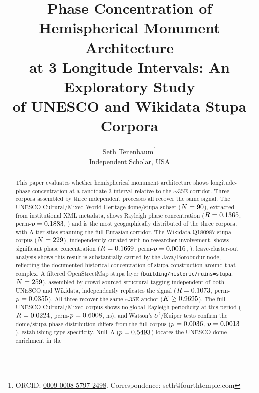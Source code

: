 \documentclass[12pt,a4paper]{article}
\begin{document}
\title{Phase Concentration of Hemispherical Monument Architecture\\
at 3\textdegree{} Longitude Intervals: An Exploratory Study\\
of UNESCO and Wikidata Stupa Corpora}

\author{Seth Tenenbaum\thanks{ORCID: \href{https://orcid.org/0009-0008-5797-2498}{0009-0008-5797-2498}.
Correspondence: seth@fourthtemple.com}\\
Independent Scholar, USA}

\maketitle

\begin{abstract}
This paper evaluates whether hemispherical monument architecture shows
longitude-phase concentration at a candidate 3\textdegree{} interval
relative to the $\sim$35\textdegree{}E corridor. Three corpora
assembled by three independent processes all recover the same signal.
The UNESCO Cultural/Mixed World Heritage dome/stupa subset
($N=90$), extracted from institutional XML metadata, shows
Rayleigh phase concentration ($R=0.1365{}$,
perm-$p=0.1883{}$, \circConcDomePSig{}) and is the most
geographically distributed of the three corpora, with A-tier sites
spanning the full Eurasian corridor. The Wikidata Q180987 stupa corpus
($N=229{}$), independently curated with no researcher
involvement, shows significant phase concentration
($R=0.1669{}$, perm-$p=0.0016{}$,
\circConcStupaPSig{}); leave-cluster-out analysis shows this result
is substantially carried by the Java/Borobudur node, reflecting the
documented historical concentration of stupa construction around that
complex. A filtered OpenStreetMap stupa layer
(\texttt{building/historic/ruins=stupa}, $N=259$),
assembled by crowd-sourced structural tagging independent of both
UNESCO and Wikidata, independently replicates the signal
($R=0.1073{}$, perm-$p=0.0355{}$).
All three recover the same $\sim$35\textdegree{}E anchor
($K \geq 0.9695{}$). The full UNESCO Cultural/Mixed
corpus shows no global Rayleigh periodicity at this period
($R=0.0224{}$, perm-$p=0.6008{}$, ns), and
Watson's $U^2$/Kuiper tests confirm the dome/stupa phase distribution
differs from the full corpus ($p=0.0036{}$,
$p=0.0013{}$), establishing type-specificity. Null~A
($p=0.5493$) locates the UNESCO dome enrichment in the

\end{abstract}
\end{document}
